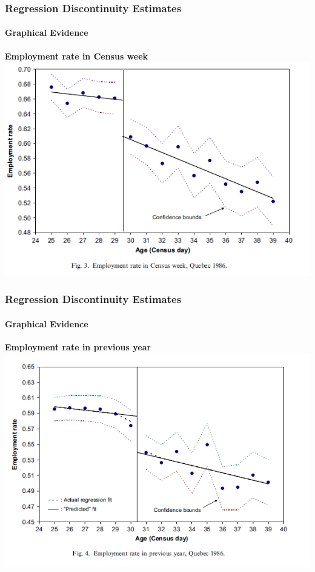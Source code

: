 \documentclass{beamer}
\begin{document}

\begin{frame}
\frametitle{Regression Discontinuity Estimates}
\framesubtitle{Graphical Evidence}


	\begin{center}
	\textbf{Employment rate in Census week}
	\includegraphics[width=.95\linewidth]{fig_3.PNG}
	
\end{center}

\end{frame}



\begin{frame}
\frametitle{Regression Discontinuity Estimates}
\framesubtitle{Graphical Evidence}

\begin{center}
		\textbf{Employment rate in previous year}
	\includegraphics[width=.95\linewidth]{fig_4.PNG}
	
\end{center}

\end{frame}
\end{document}
